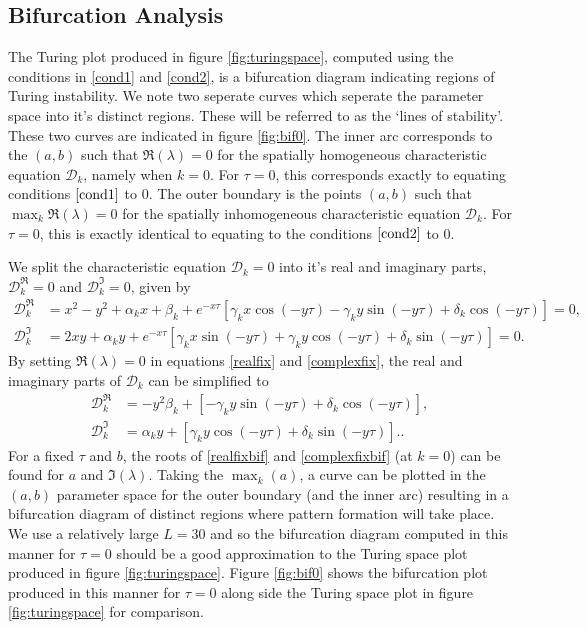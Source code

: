 \subsection{Bifurcation Analysis}\label{section:fixedbif}
The Turing plot produced in figure \ref{fig:turingspace}, computed using the conditions in \eqref{cond1} and \eqref{cond2}, is a bifurcation diagram indicating regions of Turing instability. We note two seperate curves which seperate the parameter space into it's distinct regions. These will be referred to as the `lines of stability'.
These two curves are indicated in figure \ref{fig:bif0}. The inner arc corresponds to the $(a,b)$ such that $\Re(\lambda)=0$ for the
spatially homogeneous characteristic equation $\mathcal{D}_k$, namely when $k=0$. For $\tau=0$, this corresponds exactly to equating conditions $\eqref{cond1}$ to 0. The outer boundary is the points $(a,b)$ such that $\max_k\Re(\lambda)=0$ for the spatially inhomogeneous characteristic equation $\mathcal{D}_k$. For $\tau=0$, this is exactly identical to equating to the conditions $\eqref{cond2}$ to 0.

We split the characteristic equation $\mathcal{D}_k=0$ into it's real and imaginary parts, $\mathcal{D}_k^{\Re}=0$ and $\mathcal{D}_k^{\Im}=0$, given by
\begin{align}\label{realfix}
\mathcal{D}_k^{\Re}&=x^2-y^2+\alpha_kx+\beta_k+e^{-x\tau}[\gamma_kx\cos(-y\tau)-\gamma_ky\sin(-y\tau)+\delta_k\cos(-y\tau)]=0,\\
\mathcal{D}_k^{\Im}&=2xy+\alpha_ky+e^{-x\tau}[\gamma_kx\sin(-y\tau)+\gamma_ky\cos(-y\tau)+\delta_k\sin(-y\tau)]=0.\label{complexfix}
\end{align}
By setting $\Re(\lambda)=0$ in equations \eqref{realfix} and \eqref{complexfix}, the real and imaginary parts of $\mathcal{D}_k$ can be simplified to
\begin{align}\label{realfixbif}
  \mathcal{D}_k^{\Re}&=-y^2\beta_k+[-\gamma_ky\sin(-y\tau)+\delta_k\cos(-y\tau)],\\
  \mathcal{D}_k^{\Im}&=\alpha_ky+[\gamma_ky\cos(-y\tau)+\delta_k\sin(-y\tau)].\label{complexfixbif}.
\end{align}
For a fixed $\tau$ and $b$, the roots of \eqref{realfixbif} and \eqref{complexfixbif} (at $k=0$) can be found for $a$ and $\Im(\lambda)$.
Taking the $\max_k(a)$, a curve can be plotted in the $(a,b)$ parameter space for the outer boundary (and the inner arc) resulting in a bifurcation diagram of distinct regions where pattern formation will take place. We use a relatively large $L=30$ and so the bifurcation diagram computed in this manner for $\tau=0$ should be a good approximation to the Turing space plot produced in figure \ref{fig:turingspace}. Figure \ref{fig:bif0} shows the bifurcation plot produced in this manner for $\tau=0$ along side the Turing space plot in figure \ref{fig:turingspace} for comparison.

